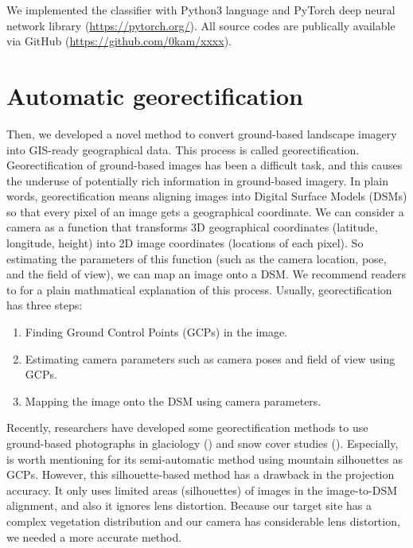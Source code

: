 \documentclass{article}
\providecommand{\tightlist}{%
  \setlength{\itemsep}{0pt}\setlength{\parskip}{0pt}}
\begin{document}
We implemented the classifier with Python3 language and PyTorch deep neural network library (\url{https://pytorch.org/}). All source codes are publically available via GitHub (\url{https://github.com/0kam/xxxx}).

\hypertarget{automatic-georectification}{%
\section{Automatic georectification}\label{automatic-georectification}}

Then, we developed a novel method to convert ground-based landscape imagery into GIS-ready geographical data. This process is called georectification. Georectification of ground-based images has been a difficult task, and this causes the underuse of potentially rich information in ground-based imagery. In plain words, georectification means aligning images into Digital Surface Models (DSMs) so that every pixel of an image gets a geographical coordinate. We can consider a camera as a function that transforms 3D geographical coordinates (latitude, longitude, height) into 2D image coordinates (locations of each pixel). So estimating the parameters of this function (such as the camera location, pose, and the field of view), we can map an image onto a DSM. We recommend readers to \cite{Portenier2020Cryosphere} for a plain mathmatical explanation of this process. Usually, georectification has three steps:

\begin{enumerate}
\def\labelenumi{\arabic{enumi}.}
\tightlist
\item
  Finding Ground Control Points (GCPs) in the image.\\
\item
  Estimating camera parameters such as camera poses and field of view using GCPs.\\
\item
  Mapping the image onto the DSM using camera parameters.
\end{enumerate}

Recently, researchers have developed some georectification methods to use ground-based photographs in glaciology (\cite{Messerli2015GeoInst}) and snow cover studies (\cite{Portenier2020Cryosphere}). Especially, \cite{Portenier2020Cryosphere} is worth mentioning for its semi-automatic method using mountain silhouettes as GCPs. However, this silhouette-based method has a drawback in the projection accuracy. It only uses limited areas (silhouettes) of images in the image-to-DSM alignment, and also it ignores lens distortion. Because our target site has a complex vegetation distribution and our camera has considerable lens distortion, we needed a more accurate method.
\end{document}
